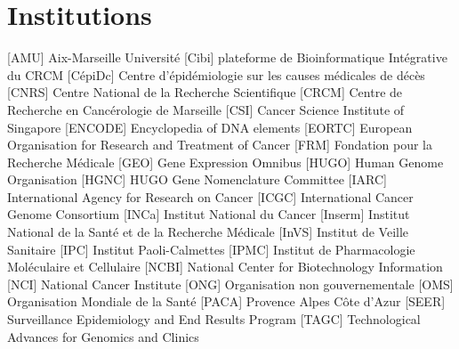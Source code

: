 	\section{\textcolor{white!15!black}{Institutions}}
		\begin{acronym}[CDKN2A]
					[AMU]		{Aix-Marseille Université}
					[Cibi]		{plateforme de Bioinformatique Intégrative du \acs{CRCM}}
				[CépiDc]	{Centre d'épidémiologie sur les causes médicales de décès}
					[CNRS]		{Centre National de la Recherche Scientifique}
					[CRCM]		{Centre de Recherche en Cancérologie de Marseille}
					[CSI]		{Cancer Science Institute of Singapore}
				[ENCODE]	{Encyclopedia of \acs{DNA} elements}
					{European Organisation for Research and Treatment of Cancer}
					[FRM]		{Fondation pour la Recherche Médicale}
					[GEO]		{Gene Expression Omnibus}
					[HUGO]		{Human Genome Organisation}
					[HGNC]		{\acs{HUGO} Gene Nomenclature Committee}
					[IARC]		{International Agency for Research on Cancer}
					[ICGC]		{International Cancer Genome Consortium}
					[INCa]		{Institut National du Cancer}
				[Inserm]	{Institut National de la Santé et de la Recherche Médicale}
					[InVS]		{Institut de Veille Sanitaire}
					[IPC]		{Institut Paoli-Calmettes}
					[IPMC]		{Institut de Pharmacologie Moléculaire et Cellulaire}
					[NCBI]		{National Center for Biotechnology Information}
					[NCI]		{National Cancer Institute}
					[ONG]		{Organisation non gouvernementale}
					[OMS]		{Organisation Mondiale de la Santé}
					[PACA]		{Provence Alpes Côte d'Azur}
					[SEER]		{Surveillance Epidemiology and End Results Program}
					[TAGC]		{Technological Advances for Genomics and Clinics}
		\end{acronym}

